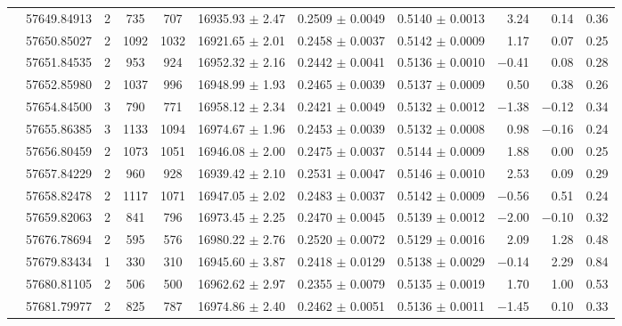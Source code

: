 \documentclass[a4paper,fleqn,usenatbib]{mnras}
\begin{document}
\begin{table*}
\begin{threeparttable}
{\begin{tabular}{c c c c c c c c r r c}
 & 57649.84913  & 2 &   735 &   707 & 16935.93 $\pm$ 2.47  &   0.2509 $\pm$ 0.0049  &   0.5140 $\pm$ 0.0013  &     3.24  &    0.14    &  0.36\\  
 & 57650.85027  & 2 &  1092 & 1032 & 16921.65 $\pm$ 2.01  &   0.2458 $\pm$ 0.0037  &   0.5142 $\pm$ 0.0009  &     1.17  &    0.07    &  0.25\\  
 & 57651.84535  & 2 &   953 &   924 & 16952.32 $\pm$ 2.16  &   0.2442 $\pm$ 0.0041  &   0.5136 $\pm$ 0.0010  &$-$0.41  &    0.08    &  0.28\\   
 & 57652.85980  & 2 &  1037 &  996 & 16948.99 $\pm$ 1.93  &   0.2465 $\pm$ 0.0039  &   0.5137 $\pm$ 0.0009  &     0.50  &    0.38    &  0.26\\  
 & 57654.84500  & 3 &   790 &   771 & 16958.12 $\pm$ 2.34  &   0.2421 $\pm$ 0.0049  &   0.5132 $\pm$ 0.0012  &$-$1.38  &   $-$0.12    &  0.34\\  
 & 57655.86385  & 3 &  1133 & 1094 & 16974.67 $\pm$ 1.96  &   0.2453 $\pm$ 0.0039  &   0.5132 $\pm$ 0.0008  &     0.98  &   $-$0.16    &  0.24\\  
 & 57656.80459  & 2 &  1073 & 1051 & 16946.08 $\pm$ 2.00  &   0.2475 $\pm$ 0.0037  &   0.5144 $\pm$ 0.0009  &     1.88  &    0.00    &  0.25\\  
 & 57657.84229  & 2 &   960 &   928 & 16939.42 $\pm$ 2.10  &   0.2531 $\pm$ 0.0047  &   0.5146 $\pm$ 0.0010  &     2.53  &    0.09    &  0.29\\   
 & 57658.82478  & 2 &  1117 &  1071 &16947.05 $\pm$ 2.02  &   0.2483 $\pm$ 0.0037  &   0.5142 $\pm$ 0.0009  &$-$0.56  &    0.51    &  0.24\\  
 & 57659.82063  & 2 &   841 &   796 & 16973.45 $\pm$ 2.25  &   0.2470 $\pm$ 0.0045  &   0.5139 $\pm$ 0.0012  &$-$2.00  &   $-$0.10    &  0.32\\[3pt]  
\parbox[t]{1mm}{}  & 57676.78694  & 2 & 595 & 576 & 16980.22 $\pm$ 2.76  &   0.2520 $\pm$ 0.0072  &   0.5129 $\pm$ 0.0016  &  2.09  & 1.28 & 0.48\\  
 & 57679.83434  & 1 &  330  & 310  & 16945.60 $\pm$ 3.87  &   0.2418 $\pm$ 0.0129  &   0.5138 $\pm$ 0.0029  &$-$0.14  & 2.29&    0.84\\  
 & 57680.81105  & 2 &  506  & 500 & 16962.62 $\pm$ 2.97  &   0.2355 $\pm$ 0.0079  &   0.5135 $\pm$ 0.0019  &     1.70 &  1.00 &   0.53 \\  
 & 57681.79977  & 2 &  825  & 787  & 16974.86 $\pm$ 2.40  &   0.2462 $\pm$ 0.0051  &   0.5136 $\pm$ 0.0011  &$-$1.45  & 0.10 &   0.33 \\  

\end{tabular}}
\end{threeparttable}
\end{table*}
\end{document}

